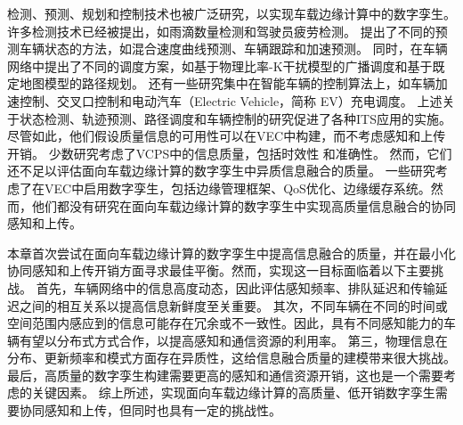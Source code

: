 检测、预测、规划和控制技术也被广泛研究，以实现车载边缘计算中的数字孪生。
许多检测技术已经被提出，如雨滴数量检测\cite{wang2021deep}和驾驶员疲劳检测\cite{chang2018design}。
提出了不同的预测车辆状态的方法，如混合速度曲线预测\cite{zhang2019a}、车辆跟踪\cite{iepure2021a}和加速预测\cite{zhang2020data}。
同时，在车辆网络中提出了不同的调度方案，如基于物理比率-K干扰模型的广播调度\cite{li2020cyber}和基于既定地图模型的路径规划\cite{lian2021cyber}。
还有一些研究集中在智能车辆的控制算法上，如车辆加速控制\cite{lv2018driving}、交叉口控制\cite{chang2021an}和电动汽车（Electric Vehicle，简称 EV）充电调度\cite{wi2013electric}。
上述关于状态检测、轨迹预测、路径调度和车辆控制的研究促进了各种ITS应用的实施。尽管如此，他们假设质量信息的可用性可以在VEC中构建，而不考虑感知和上传开销。
少数研究考虑了VCPS中的信息质量，包括时效性\cite{liu2014temporal, dai2019temporal} 和准确性\cite{rager2017scalability, yoon2021performance}。
然而，它们还不足以评估面向车载边缘计算的数字孪生中异质信息融合的质量。
一些研究考虑了在VEC中启用数字孪生，包括边缘管理框架\cite{zhang2021adaptive}、QoS优化\cite{xu2022service}、边缘缓存系统\cite{zhang2022digital}。然而，他们都没有研究在面向车载边缘计算的数字孪生中实现高质量信息融合的协同感知和上传。

本章首次尝试在面向车载边缘计算的数字孪生中提高信息融合的质量，并在最小化协同感知和上传开销方面寻求最佳平衡。然而，实现这一目标面临着以下主要挑战。
首先，车辆网络中的信息高度动态，因此评估感知频率、排队延迟和传输延迟之间的相互关系以提高信息新鲜度至关重要。
其次，不同车辆在不同的时间或空间范围内感应到的信息可能存在冗余或不一致性。因此，具有不同感知能力的车辆有望以分布式方式合作，以提高感知和通信资源的利用率。
第三，物理信息在分布、更新频率和模式方面存在异质性，这给信息融合质量的建模带来很大挑战。
最后，高质量的数字孪生构建需要更高的感知和通信资源开销，这也是一个需要考虑的关键因素。
综上所述，实现面向车载边缘计算的高质量、低开销数字孪生需要协同感知和上传，但同时也具有一定的挑战性。

